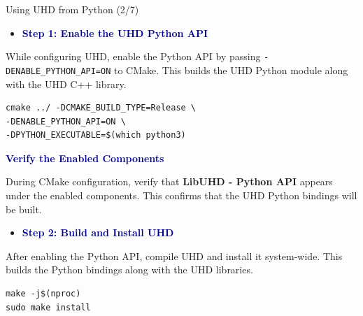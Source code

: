 \begin{frame}[fragile]{Using UHD from Python (2/7)}
\vspace{-0.5cm}
\footnotesize

\begin{itemize}
    \item \textbf{\textcolor{DarkBlue}{Step 1: Enable the UHD Python API}}
\end{itemize}

\hspace{2.8em}
\parbox{0.88\linewidth}{
\footnotesize
While configuring UHD, enable the Python API by passing
\texttt{-DENABLE\_PYTHON\_API=ON} to CMake. This builds the UHD Python
module along with the UHD C++ library.
}

\vspace{0.2cm}

\scriptsize
\begin{Verbatim}[xleftmargin=3.8em,breaklines,breaksymbolleft={},breaksymbolright={}]
cmake ../ -DCMAKE_BUILD_TYPE=Release \
-DENABLE_PYTHON_API=ON \
-DPYTHON_EXECUTABLE=$(which python3)
\end{Verbatim}





\hspace{2.8em}
\parbox{0.88\linewidth}{
\scriptsize
\textbf{\textcolor{DarkBlue}{Verify the Enabled Components}}

During CMake configuration, verify that
\textbf{LibUHD - Python API} appears under the enabled components.
This confirms that the UHD Python bindings will be built.
}
\vspace{0.5cm}
\begin{itemize}
    \item \textbf{\textcolor{DarkBlue}{Step 2: Build and Install UHD}}
\end{itemize}

\hspace{2.8em}
\parbox{0.88\linewidth}{
\footnotesize
After enabling the Python API, compile UHD and install it system-wide.
This builds the Python bindings along with the UHD libraries.
}

\vspace{0.2cm}

\scriptsize
\begin{Verbatim}[xleftmargin=3.8em]
make -j$(nproc)
sudo make install
\end{Verbatim}

\vspace{0.2cm}



\end{frame}